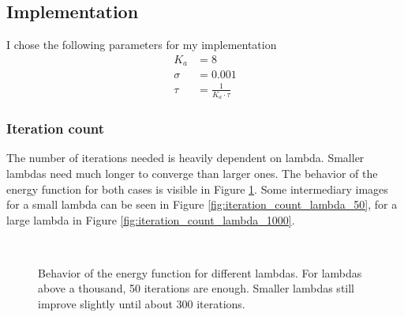 \documentclass{paper}
\begin{document}
\subsection*{Implementation}
I chose the following parameters for my implementation
\begin{align}
	K_a 	&= 8 \\
	\sigma 	&= 0.001 \\
	\tau  	&= \frac{1}{K_a \cdot \tau}
	\label{eq:tau}
\end{align}
\subsubsection*{Iteration count}
The number of iterations needed is heavily dependent on lambda. 
Smaller lambdas need much longer to converge than larger ones. 
The behavior of the energy function for both cases is visible in Figure \ref{fig:energy_plots}. 
Some intermediary images for a small lambda can be seen in Figure \ref{fig:iteration_count_lambda_50}, for a large lambda in Figure \ref{fig:iteration_count_lambda_1000}.
\begin{figure}[ht!]%
\centering
{}
 \\
\caption{Behavior of the energy function for different lambdas. For lambdas above 
a thousand, 50 iterations are enough. Smaller lambdas still improve slightly until about 300 iterations.}
\label{fig:energy_plots}
\end{figure}
\end{document}
